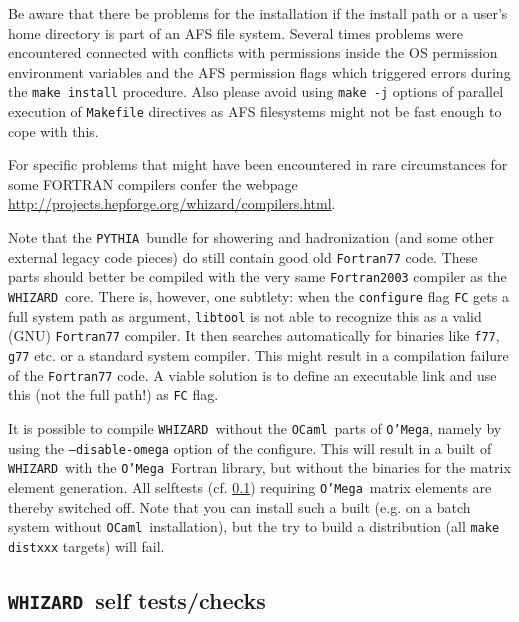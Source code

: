 \documentclass[12pt]{book}
\newcommand{\ttt}[1]{\texttt{#1}}
\newcommand{\whizard}{\texttt{WHIZARD}}
\newcommand{\oMega}{\texttt{O'Mega}}
\newcommand{\pythia}{\texttt{PYTHIA}}
\newcommand{\ocaml}{\texttt{OCaml}}
\begin{document}
Be aware that there be problems for the installation if the install
path or a user's home directory is part of an AFS file system. Several
times problems were encountered connected with conflicts with
permissions inside the OS permission environment variables and the AFS
permission flags which triggered errors during the \ttt{make install}
procedure. Also please avoid using \ttt{make -j} options of parallel
execution of \ttt{Makefile} directives as AFS filesystems might not be 
fast enough to cope with this.

For specific problems that might have been encountered in rare
circumstances for some FORTRAN compilers confer the webpage
\url{http://projects.hepforge.org/whizard/compilers.html}.

Note that the \pythia\  bundle for showering and hadronization (and
some other external legacy code pieces) do still contain good old
\ttt{Fortran77} code. These parts should better be 
compiled with the very same \ttt{Fortran2003} compiler as the
\whizard\ core. There is, however, one subtlety:  
when the \ttt{configure} flag \ttt{FC} gets a full system path as
argument, \ttt{libtool} is not able to recognize this as a valid (GNU)
\ttt{Fortran77} compiler. It then searches automatically for binaries 
like \ttt{f77}, \ttt{g77} etc. or a standard system compiler. This 
might result in a compilation failure of the \ttt{Fortran77} code. A
viable solution is to define an executable link and use this (not the
full path!) as \ttt{FC} flag.

It is possible to compile \whizard\ without the \ocaml\ parts of
\oMega, namely by using the \ttt{--disable-omega} option of the
configure. This will result in a built of \whizard\ with the \oMega\
Fortran library, but without the binaries for the matrix element
generation. All selftests (cf. \ref{sec:selftests}) requiring \oMega\
matrix elements are thereby switched off. Note that you can install
such a built (e.g. on a batch system without \ocaml\ installation), but
the try to build a distribution (all \ttt{make distxxx} targets) will fail.




\subsection{\whizard\ self tests/checks}
\label{sec:selftests}
\end{document}
